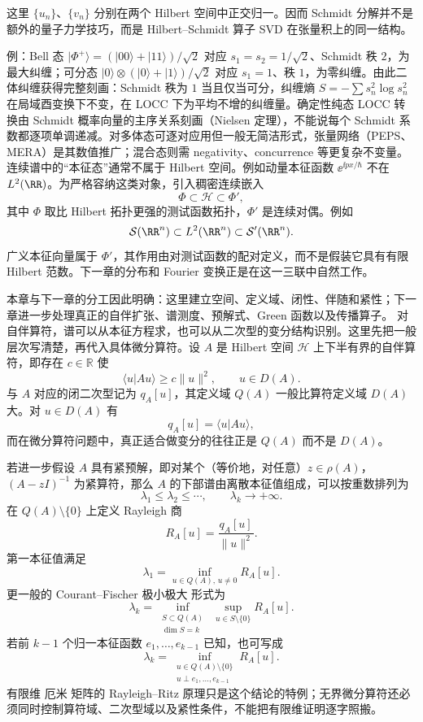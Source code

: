 这里 $\{u_n\}$、$\{v_n\}$ 分别在两个 Hilbert 空间中正交归一。因而 Schmidt 分解并不是额外的量子力学技巧，而是 Hilbert--Schmidt 算子 SVD 在张量积上的同一结构。

例：Bell 态 $|\Phi^+\rangle=(|00\rangle+|11\rangle)/\sqrt2$ 对应 $s_1=s_2=1/\sqrt2$、Schmidt 秩 $2$，为最大纠缠；可分态 $|0\rangle\otimes(|0\rangle+|1\rangle)/\sqrt2$ 对应 $s_1=1$、秩 $1$，为零纠缠。由此二体纠缠获得完整刻画：Schmidt 秩为 $1$ 当且仅当可分，纠缠熵 $S=-\sum s_n^2\log s_n^2$ 在局域酉变换下不变，在 LOCC 下为平均不增的纠缠量。确定性纯态 LOCC 转换由 Schmidt 概率向量的主序关系刻画（Nielsen 定理），不能说每个 Schmidt 系数都逐项单调递减。对多体态可逐对应用但一般无简洁形式，张量网络（PEPS、MERA）是其数值推广；混合态则需 negativity、concurrence 等更复杂不变量。
连续谱中的“本征态”通常不属于 Hilbert 空间。例如动量本征函数 $\ee^{\ii px/\hbar}$ 不在 $L^2(\RR)$。为严格容纳这类对象，引入稠密连续嵌入
\[
\boxed{\Phi\subset\mathcal H\subset\Phi'},
\]
其中 $\Phi$ 取比 Hilbert 拓扑更强的测试函数拓扑，$\Phi'$ 是连续对偶。例如
\[
\mathcal S(\RR^n)
\subset L^2(\RR^n)
\subset\mathcal S'(\RR^n).
\]
广义本征向量属于 $\Phi'$，其作用由对测试函数的配对定义，而不是假装它具有有限 Hilbert 范数。下一章的分布和 Fourier 变换正是在这一三联中自然工作。

本章与下一章的分工因此明确：这里建立空间、定义域、闭性、伴随和紧性；下一章进一步处理真正的自伴扩张、谱测度、预解式、Green 函数以及传播算子。
对自伴算符，谱可以从本征方程求，也可以从二次型的变分结构识别。这里先把一般层次写清楚，再代入具体微分算符。设 $A$ 是 Hilbert 空间 $\mathcal H$ 上下半有界的自伴算符，即存在 $c\in\mathbb R$ 使
\[
\langle u|Au\rangle\ge c\|u\|^2,
\qquad u\in D(A).
\]
与 $A$ 对应的闭二次型记为 $q_A[u]$，其定义域 $Q(A)$ 一般比算符定义域 $D(A)$ 大。对 $u\in D(A)$ 有
\[
q_A[u]=\langle u|Au\rangle,
\]
而在微分算符问题中，真正适合做变分的往往正是 $Q(A)$ 而不是 $D(A)$。

若进一步假设 $A$ 具有紧预解，即对某个（等价地，对任意）$z\in\rho(A)$，$(A-zI)^{-1}$ 为紧算符，那么 $A$ 的下部谱由离散本征值组成，可以按重数排列为
\[
\lambda_1\le\lambda_2\le\cdots,
\qquad \lambda_k\to+\infty.
\]
在 $Q(A)\setminus\{0\}$ 上定义 Rayleigh 商
\[
R_A[u]=\frac{q_A[u]}{\|u\|^2}.
\]
第一本征值满足
\begin{equation}
\boxed{
\lambda_1=\inf_{u\in Q(A),\,u\ne0}R_A[u]
}.
\label{eq:rayleigh-ritz-first}
\end{equation}
更一般的 Courant--Fischer 极小极大 形式为
\begin{equation}
\boxed{
\lambda_k=
\inf_{\substack{S\subset Q(A)\\ \dim S=k}}
\ \sup_{u\in S\setminus\{0\}}R_A[u]
}.
\label{eq:courant-fischer-form}
\end{equation}
若前 $k-1$ 个归一本征函数 $e_1,\ldots,e_{k-1}$ 已知，也可写成
\[
\lambda_k=
\inf_{\substack{u\in Q(A)\setminus\{0\}\\u\perp e_1,\ldots,e_{k-1}}}
R_A[u].
\]
有限维 厄米 矩阵的 Rayleigh--Ritz 原理只是这个结论的特例；无界微分算符还必须同时控制算符域、二次型域以及紧性条件，不能把有限维证明逐字照搬。

